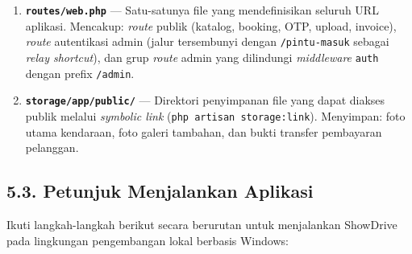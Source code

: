 \documentclass[11pt, a5paper]{article}
\begin{document}
\begin{enumerate}[label=\arabic*.]
  \item \textbf{\texttt{routes/web.php}} --- Satu-satunya file yang mendefinisikan
        seluruh URL aplikasi. Mencakup: \textit{route} publik (katalog, booking,
        OTP, upload, invoice), \textit{route} autentikasi admin (jalur tersembunyi
        dengan \texttt{/pintu-masuk} sebagai \textit{relay shortcut}), dan grup
        \textit{route} admin yang dilindungi \textit{middleware} \texttt{auth}
        dengan prefix \texttt{/admin}.

  \item \textbf{\texttt{storage/app/public/}} --- Direktori penyimpanan file
        yang dapat diakses publik melalui \textit{symbolic link} (\texttt{php
        artisan storage:link}). Menyimpan: foto utama kendaraan, foto galeri
        tambahan, dan bukti transfer pembayaran pelanggan.
\end{enumerate}

\subsection*{5.3. Petunjuk Menjalankan Aplikasi}

Ikuti langkah-langkah berikut secara berurutan untuk menjalankan ShowDrive
pada lingkungan pengembangan lokal berbasis Windows:
\end{document}
